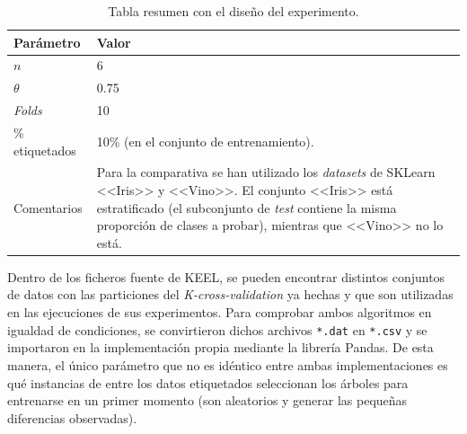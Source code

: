\begin{table}
	\begin{centering}
		\begin{tabular}{@{}p{10em} p{20em} @{}}
			\toprule
			\textbf{Parámetro} & \textbf{Valor} \\ 
			\midrule
			$n$ & 6\\
			$\theta$ & 0.75 \\
			\textit{Folds} & 10 \\
			\% etiquetados & 10\% (en el conjunto de entrenamiento). \\
			Comentarios & Para la comparativa se han utilizado los \textit{datasets} de SKLearn <<Iris>> y <<Vino>>. El conjunto <<Iris>> está estratificado (el subconjunto de \textit{test} contiene la misma proporción de clases a probar), mientras que <<Vino>> no lo está. \\
			\bottomrule
			
		\end{tabular}
	\end{centering}
	\caption{Tabla resumen con el diseño del experimento.}
	\label{tabla_coforest_keelvsnuestro_diseño}	
\end{table}

Dentro de los ficheros fuente de KEEL, se pueden encontrar distintos conjuntos de datos con las particiones del \textit{K-cross-validation} ya hechas y que son utilizadas en las ejecuciones de sus experimentos. Para comprobar ambos algoritmos en igualdad de condiciones, se convirtieron dichos archivos \texttt{*.dat} en \texttt{*.csv} y se importaron en la implementación propia mediante la librería Pandas. De esta manera, el único parámetro que no es idéntico entre ambas implementaciones es qué instancias de entre los datos etiquetados seleccionan los árboles para entrenarse en un primer momento (son aleatorios y generar las pequeñas diferencias observadas).

